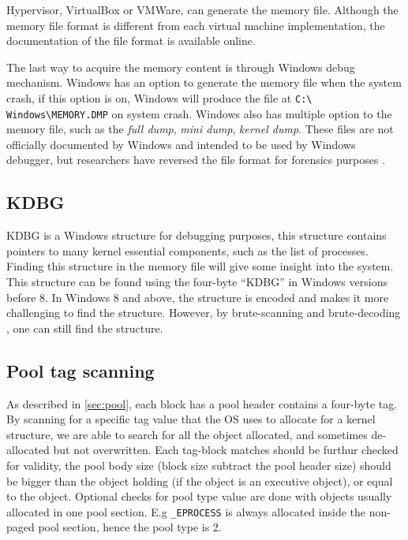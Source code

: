 Hypervisor, VirtualBox or VMWare, can generate the memory file.  Although the
memory file format is different from each virtual machine implementation, the
documentation of the file format is available online.

The last way to acquire the memory content is through Windows debug mechanism.
Windows has an option to generate the memory file when the system crash, if
this option is on, Windows will produce the file at \texttt{C:\textbackslash
Windows\textbackslash MEMORY.DMP} on system crash. Windows also has multiple
option to the memory file, such as the \textit{full dump}, \textit{mini dump},
\textit{kernel dump}. These files are not officially documented by Windows and
intended to be used by Windows debugger, but researchers have reversed the file
format for forensics purposes \cite{mdmpfile} \cite{dmpfile}.

\subsection[KDBG]{KDBG}

KDBG is a Windows structure for debugging purposes, this structure contains
pointers to many kernel essential components, such as the list of processes.
Finding this structure in the memory file will give some insight into the
system.  This structure can be found using the four-byte ``KDBG'' in Windows
versions before 8. In Windows 8 and above, the structure is encoded and makes
it more challenging to find the structure. However, by brute-scanning and
brute-decoding \cite{kdbgEncoded}, one can still find the structure.

\subsection[Pool tag scanning]{Pool tag scanning}

As described in \ref{sec:pool}, each block has a pool header contains a
four-byte tag. By scanning for a specific tag value that the OS uses to
allocate for a kernel structure, we are able to search for all the object
allocated, and sometimes de-allocated but not overwritten. Each tag-block
matches should be furthur checked for validity, the pool body size (block size
subtract the pool header size) should be bigger than the object holding (if the
object is an executive object), or equal to the object.  Optional checks for
pool type value are done with objects usually allocated in one pool section.
E.g \texttt{\_EPROCESS} is always allocated inside the non-paged pool section,
hence the pool type is 2.

